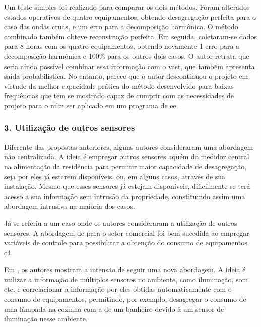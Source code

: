 \begin{enumerate}[label=\textbf{2.\arabic*},wide=\parindent]
Um teste simples foi realizado para comparar os dois métodos. Foram
alterados estados operativos de quatro equipamentos, obtendo desagregação
perfeita para o caso das ondas cruas, e um erro para a decomposição
harmônica. O método combinado também obteve reconstrução perfeita.
Em seguida, coletaram-se dados para 8 horas com os quatro equipamentos,
obtendo novamente 1 erro para a decomposição harmônica e 100\% para os
outros dois casos. O autor retrata que seria ainda possível combinar
essa informação com o \gls{vast}, que também apresenta saída
probabilística. No entanto, parece que o autor descontinuou o projeto
em virtude da melhor capacidade prática do método desenvolvido para
baixas frequências que tem se mostrado capaz de cumprir com as
necessidades de projeto para o \gls{nilm} ser aplicado em um programa
de \gls{ee}.

\end{enumerate}

\subsubsection{3. Utilização de outros sensores}
\label{top:seminilm}

Diferente das propostas anteriores, alguns autores consideraram uma
abordagem não centralizada. A ideia é empregar outros sensores aquém
do medidor central na alimentação da residência para permitir maior
capacidade de desagregação, seja por eles já estarem disponíveis, ou,
em alguns casos, através de sua instalação. Mesmo que esses sensores
já estejam disponíveis, dificilmente se terá acesso a sua informação
sem intrusão da propriedade, constituindo assim uma abordagem
intrusiva na maioria dos casos.

Já se referiu a um caso onde os autores consideraram a utilização de
outros sensores. A abordagem de
\cite{nilm_norford_leeb_medianfilt_1996_13} para o setor comercial foi
bem sucedida ao empregar variáveis de controle para possibilitar a
obtenção do consumo de equipamentos \gls{c4}.

Em \cite{seminilm_berges_multisensor_2010}, os autores mostram a
intensão de seguir uma nova abordagem. A ideia é utilizar a informação
de múltiplos sensores no ambiente, como iluminação, som etc. e
correlacionar a informação por eles obtidas automaticamente com o
consumo de equipamentos, permitindo, por exemplo, desagregar o consumo de
uma lâmpada na cozinha com a de um banheiro devido à um sensor de
iluminação nesse ambiente.

